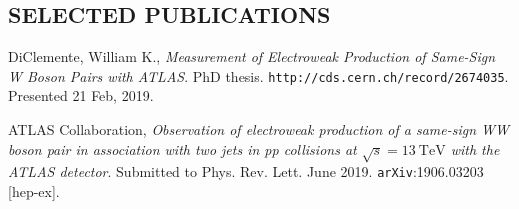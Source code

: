 \documentclass[11pt]{res}
\begin{document}
\begin{resume}

%
%

\section{SELECTED PUBLICATIONS}
    DiClemente, William K., {\it Measurement of Electroweak Production of Same-Sign W Boson Pairs with ATLAS}.  PhD thesis. {\tt http://cds.cern.ch/record/2674035}. Presented 21 Feb, 2019.

    ATLAS Collaboration, {\it Observation of electroweak production of a same-sign WW boson pair in association with two jets in pp collisions at $\sqrt{s}=13~\textrm{TeV}$ with the ATLAS detector}. Submitted to Phys. Rev. Lett. June 2019. {\tt arXiv}:1906.03203 [hep-ex].


\end{resume}
\end{document}
